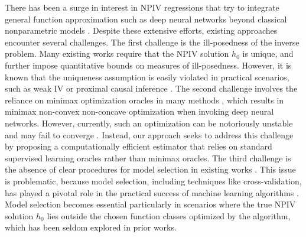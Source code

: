 There has been a surge in interest in NPIV regressions that try to integrate general function approximation such as deep neural networks beyond classical nonparametric models \citep{hartford2017deep,singh2019kernel,xu2021deep,zhang2023instrumental,dikkala2020minimax,bennett2020variational,bennett2023minimax,bennett2023source,kallus2022causal,singh2020kernel}. 
Despite these extensive efforts, existing approaches encounter several challenges. The first challenge is the ill-posedness of the inverse problem. Many existing works \citep{liao2020provably,newey2003instrumental,florens2011identification,kato2021learning} require that the NPIV solution $h_0$ is unique, and further impose quantitative bounds on measures of ill-posedness.
However, it is known that the uniqueness assumption is easily violated in practical scenarios, such as weak IV \citep{andrews2005inference, andrews2019weak} or proximal causal inference \citep{kallus2021causal}.
The second challenge involves the reliance on minimax optimization oracles in many methods \citep{bennett2023minimax,dikkala2020minimax,liao2020provably,bennett2023source,zhang2023instrumental}, which results in minimax non-convex non-concave optimization when invoking deep neural networks. However, currently, such an optimization can be notoriously unstable and may fail to converge \citep{lin2020near,jin2020local,lin2020gradient,diakonikolas2021efficient,razaviyayn2020nonconvex}. Instead, our approach seeks to address this challenge by proposing a computationally efficient estimator that relies on standard supervised learning oracles rather than minimax oracles. The third challenge is the absence of clear procedures for model selection in existing works \citep{xu2021deep,zhang2023instrumental,cui2020semiparametric,hartford2017deep}. This issue is problematic, because model selection, including techniques like cross-validation, has played a pivotal role in the practical success of machine learning algorithms \citep{bartlett2002model,gold2003model,guyon2010model,cawley2010over,raschka2018model,emmert2019evaluation,mcallester2003pac}. Model selection becomes essential particularly in scenarios where the true NPIV solution $h_0$ lies outside the chosen function classes optimized by the algorithm, which has been seldom explored in prior works. 

